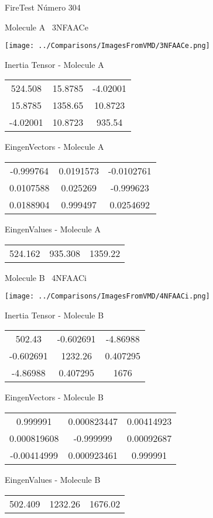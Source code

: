 \vtab[-3cm]
\begin{center}
{\large FireTest \tab Número 304}
\end{center}
\begin{multicols}{2}
\begin{center}

Molecule A \
3NFAACe

\texttt{[image: ../Comparisons/ImagesFromVMD/3NFAACe.png]}

Inertia Tensor - Molecule A \\
\begin{tabular}{|c c c|}
524.508	 & 	15.8785	 & 	-4.02001	 \\
15.8785	 & 	1358.65	 & 	10.8723	 \\
-4.02001	 & 	10.8723	 & 	935.54
\end{tabular}

\vtab
 EingenVectors - Molecule A     \\
\begin{tabular}{|c c c|}
-0.999764	 & 	0.0191573	 & 	-0.0102761	 \\
0.0107588	 & 	0.025269	 & 	-0.999623	 \\
0.0188904	 & 	0.999497	 & 	0.0254692
\end{tabular}

\vtab
 EingenValues - Molecule A     \\
\begin{tabular}{|c c c|}
524.162	 & 	935.308	 & 	1359.22	 \\
\end{tabular}
\columnbreak

Molecule B \
4NFAACi

\texttt{[image: ../Comparisons/ImagesFromVMD/4NFAACi.png]}

Inertia Tensor - Molecule B \\
\begin{tabular}{|c c c|}
502.43	 & 	-0.602691	 & 	-4.86988	 \\
-0.602691	 & 	1232.26	 & 	0.407295	 \\
-4.86988	 & 	0.407295	 & 	1676
\end{tabular}

\vtab
 EingenVectors - Molecule B     \\
\begin{tabular}{|c c c|}
0.999991	 & 	0.000823447	 & 	0.00414923	 \\
0.000819608	 & 	-0.999999	 & 	0.00092687	 \\
-0.00414999	 & 	0.000923461	 & 	0.999991
\end{tabular}

\vtab
 EingenValues - Molecule B     \\
\begin{tabular}{|c c c|}
502.409	 & 	1232.26	 & 	1676.02	 \\
\end{tabular}

\end{center}
\end{multicols}

